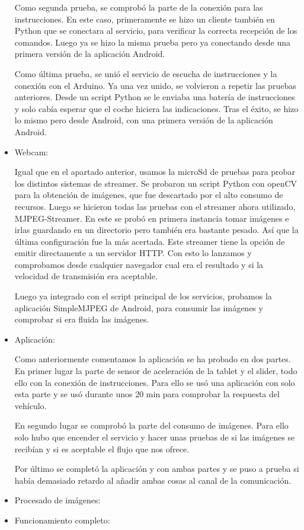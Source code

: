 \documentclass{pclass}
\begin{document}
\begin{itemize}
		Como segunda prueba, se comprobó la parte de la conexión para las instrucciones. En este caso, primeramente se hizo un cliente también en Python que se conectara al servicio, para verificar la correcta recepción de los comandos. Luego ya se hizo la misma prueba pero ya conectando desde una primera versión de la aplicación Android.
		
		Como última prueba, se unió el servicio de escucha de instrucciones y la conexión con el Arduino. Ya una vez unido, se volvieron a repetir las pruebas anteriores. Desde un script Python se le enviaba una batería de instrucciones y solo cabía esperar que el coche hiciera las indicaciones. Tras el éxito, se hizo lo mismo pero desde Android, con una primera versión de la aplicación Android.
		
	
	
	\item Webcam:
	
		Igual que en el apartado anterior, usamos la microSd de pruebas para probar los distintos sistemas de streamer. Se probaron un script Python con openCV para la obtención de imágenes, que fue descartado por el alto consumo de recursos. Luego se hicieron todas las pruebas con el streamer ahora utilizado, MJPEG-Streamer. En este se probó en primera instancia tomar imágenes e irlas guardando en un directorio pero también era bastante pesado. Así que la última configuración fue la más acertada. Este streamer tiene la opción de emitir directamente a un servidor HTTP. Con esto lo lanzamos y comprobamos desde cualquier navegador cual era el resultado y si la velocidad de transmisión era aceptable.
		
		Luego ya integrado con el script principal de los servicios, probamos la aplicación SimpleMJPEG de Android, para consumir las imágenes y comprobar si era fluida las imágenes.
	
	\item Aplicación:
	
		Como anteriormente comentamos la aplicación se ha probado en dos partes. En primer lugar la parte de sensor de aceleración de la tablet y el slider, todo ello con la conexión de instrucciones. Para ello se usó una aplicación con solo esta parte y se usó durante unos 20 min para comprobar la respuesta del vehículo.
		
		En segundo lugar se comprobó la parte del consumo de imágenes. Para ello solo hubo que encender el servicio y hacer unas pruebas de si las imágenes se recibían y si es aceptable el flujo que nos ofrece.
		
		Por último se completó la aplicación y con ambas partes y se puso a prueba si había demasiado retardo al añadir ambas cosas al canal de la comunicación.
		
	\item Procesado de imágenes:
	
	\item Funcionamiento completo:
	
		
	
\end{itemize}
\end{document}
